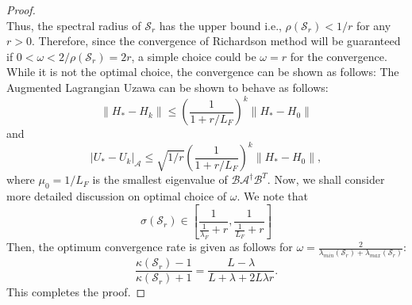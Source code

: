 \documentclass{article}
\theoremstyle{definition}
\begin{document}
\begin{proof}
\begin{equation}
\end{equation}
Thus, the spectral radius of $\mathcal{S}_r$ has the upper bound i.e., $\rho(\mathcal{S}_r) < 1/r$ for any $r > 0$. Therefore, since the convergence of Richardson method will be guaranteed if $0 < \omega < 2/\rho(\mathcal{S}_r) = 2r$, a simple choice could be $\omega = r$ for the convergence. While it is not the optimal choice, the convergence can be shown as follows: The Augmented Lagrangian Uzawa can be shown to behave as follows: 
\begin{equation}
\|H_* - H_k\| \leq \left ( \frac{1}{1 + r/L_F}\right )^k \|H_* - H_0\| 
\end{equation} 
and 
\begin{equation}
|U_* - U_k|_{\mathcal{A}} \leq \sqrt{1/r} \left ( \frac{1}{1 + r/ L_F}\right )^k \|H_* - H_0\|,  
\end{equation} 
where $\mu_0 = 1/L_F$ is the smallest eigenvalue of $\mathcal{B} \mathcal{A}^{\dag} \mathcal{B}^T$. Now, we shall consider more detailed discussion on optimal choice of $\omega$. We note that 
\begin{equation}
\sigma(\mathcal{S}_r) \in \left [ \frac{1}{\frac{1}{\lambda_F} + r},\frac{1}{\frac{1}{L_F} + r}\right ]
\end{equation} 
Then, the optimum convergence rate is given as follows for $\omega = \frac{2}{\lambda_{min}(\mathcal{S}_r) + \lambda_{max}(\mathcal{S}_r)}$: 
\begin{equation}
\frac{\kappa(\mathcal{S}_r) - 1}{\kappa(\mathcal{S}_r) + 1} = \frac{L - \lambda}{L + \lambda + 2 L \lambda r}.
\end{equation} 
This completes the proof. 
\end{proof} 
\end{document}

